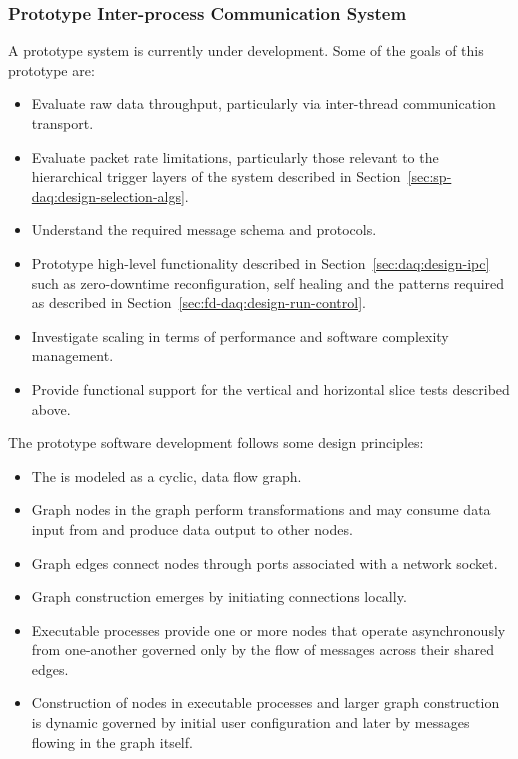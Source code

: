 
\subsubsection{Prototype Inter-process Communication System}

A prototype  system is currently under development. 
Some of the goals of this prototype are:

\begin{itemize}
\item Evaluate raw data throughput, particularly via inter-thread communication transport.
\item Evaluate packet rate limitations, particularly those relevant to the hierarchical trigger layers of the  system described in Section~\ref{sec:sp-daq:design-selection-algs}.
\item Understand the required message schema and protocols.
\item Prototype high-level functionality described in Section~\ref{sec:daq:design-ipc} such as zero-downtime reconfiguration, self healing and the patterns required  as described in Section~\ref{sec:fd-daq:design-run-control}.
\item Investigate scaling in terms of performance and software complexity management.
\item Provide functional support for the vertical and horizontal slice tests described above.
\end{itemize}

The prototype software development follows some design principles:

\begin{itemize}
\item The  is modeled as a cyclic, data flow graph.
\item Graph nodes in the graph perform transformations and may consume data input from and produce data output to other nodes.
\item Graph edges connect nodes through ports associated with a network socket.
\item Graph construction emerges by initiating connections locally.
\item Executable processes provide one or more nodes that operate asynchronously from one-another governed only by the flow of messages across their shared edges.
\item Construction of nodes in executable processes and larger graph construction is dynamic governed by initial user configuration and later by messages flowing in the graph itself.
\end{itemize}

